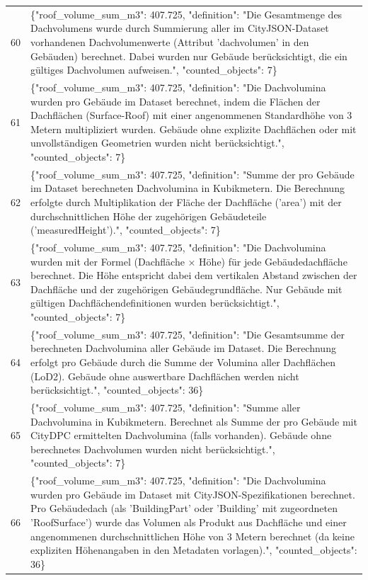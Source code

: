\documentclass[a4paper,11pt]{article}
\begin{document}
\begin{table}[ht]
\begin{tabular}{r p{12cm}}
60 & \{"roof\_volume\_sum\_m3": 407.725, "definition": "Die Gesamtmenge des Dachvolumens wurde durch Summierung aller im CityJSON-Dataset vorhandenen Dachvolumenwerte (Attribut 'dachvolumen' in den Gebäuden) berechnet. Dabei wurden nur Gebäude berücksichtigt, die ein gültiges Dachvolumen aufweisen.", "counted\_objects": 7\} \\
61 & \{"roof\_volume\_sum\_m3": 407.725, "definition": "Die Dachvolumina wurden pro Gebäude im Dataset berechnet, indem die Flächen der Dachflächen (Surface-Roof) mit einer angenommenen Standardhöhe von 3 Metern multipliziert wurden. Gebäude ohne explizite Dachflächen oder mit unvollständigen Geometrien wurden nicht berücksichtigt.", "counted\_objects": 7\} \\
62 & \{"roof\_volume\_sum\_m3": 407.725, "definition": "Summe der pro Gebäude im Dataset berechneten Dachvolumina in Kubikmetern. Die Berechnung erfolgte durch Multiplikation der Fläche der Dachfläche ('area') mit der durchschnittlichen Höhe der zugehörigen Gebäudeteile ('measuredHeight').", "counted\_objects": 7\} \\
63 & \{"roof\_volume\_sum\_m3": 407.725, "definition": "Die Dachvolumina wurden mit der Formel (Dachfläche × Höhe) für jede Gebäudedachfläche berechnet. Die Höhe entspricht dabei dem vertikalen Abstand zwischen der Dachfläche und der zugehörigen Gebäudegrundfläche. Nur Gebäude mit gültigen Dachflächendefinitionen wurden berücksichtigt.", "counted\_objects": 7\} \\
64 & \{"roof\_volume\_sum\_m3": 407.725, "definition": "Die Gesamtsumme der berechneten Dachvolumina aller Gebäude im Dataset. Die Berechnung erfolgt pro Gebäude durch die Summe der Volumina aller Dachflächen (LoD2). Gebäude ohne auswertbare Dachflächen werden nicht berücksichtigt.", "counted\_objects": 36\} \\
65 & \{"roof\_volume\_sum\_m3": 407.725, "definition": "Summe aller Dachvolumina in Kubikmetern. Berechnet als Summe der pro Gebäude mit CityDPC ermittelten Dachvolumina (falls vorhanden). Gebäude ohne berechnetes Dachvolumen wurden nicht berücksichtigt.", "counted\_objects": 7\} \\
66 & \{"roof\_volume\_sum\_m3": 407.725, "definition": "Die Dachvolumina wurden pro Gebäude im Dataset mit CityJSON-Spezifikationen berechnet. Pro Gebäudedach (als 'BuildingPart' oder 'Building' mit zugeordneten 'RoofSurface') wurde das Volumen als Produkt aus Dachfläche und einer angenommenen durchschnittlichen Höhe von 3 Metern berechnet (da keine expliziten Höhenangaben in den Metadaten vorlagen).", "counted\_objects": 36\} \\

\end{tabular}
\end{table}
\end{document}
